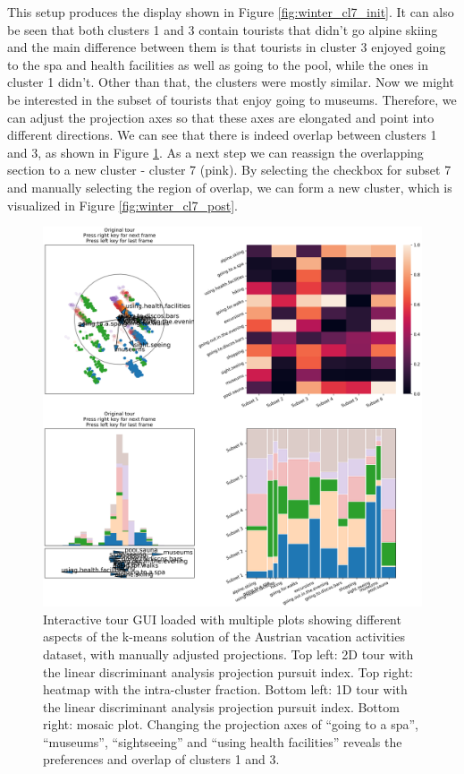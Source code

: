 \documentclass[article]{ajs}
\begin{document}
This setup produces the display shown in Figure \ref{fig:winter_cl7_init}. It can also be seen that both clusters 1 and 3 contain tourists that didn't go alpine skiing and the main difference between them is that tourists in cluster 3 enjoyed going to the spa and health facilities as well as going to the pool, while the ones in cluster 1 didn't. Other than that, the clusters were mostly similar. Now we might be interested in the subset of tourists that enjoy going to museums. Therefore, we can adjust the projection axes so that these axes are elongated and point into different directions. We can see that there is indeed overlap between clusters 1 and 3, as shown in Figure \ref{fig:winter_cl7_pre}. As a next step we can reassign the overlapping section to a new cluster - cluster 7 (pink). By selecting the checkbox for subset 7 and manually selecting the region of overlap, we can form a new cluster, which is visualized in Figure \ref{fig:winter_cl7_post}.

\begin{figure}[h!]
    \centering
    \includegraphics[width=1\textwidth]{winter_cl7_pre.png}
    \caption{Interactive tour GUI loaded with multiple plots showing different aspects of the k-means solution of the Austrian vacation activities dataset, with manually adjusted projections. Top left: 2D tour with the linear discriminant analysis projection pursuit index. Top right: heatmap with the intra-cluster fraction. Bottom left: 1D tour with the linear discriminant analysis projection pursuit index. Bottom right: mosaic plot. Changing the projection axes of ``going to a spa'', ``museums'', ``sightseeing'' and ``using health facilities'' reveals the preferences and overlap of clusters 1 and 3.}
    \label{fig:winter_cl7_pre}
\end{figure}
\end{document}
